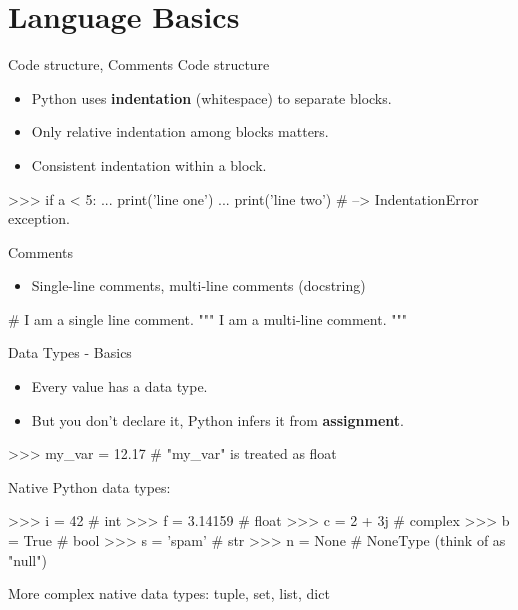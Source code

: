 \documentclass[10pt]{beamer}
\begin{document}
\section{Language Basics}

\begin{frame}[fragile]{Code structure, Comments}
	Code structure
	\begin{itemize}
		\item \pause Python uses \textbf{indentation} (whitespace) to separate blocks.
		\item \pause Only relative indentation among blocks matters.
		\item \pause Consistent indentation within a block.
	\end{itemize}

	\pause
    \begin{pythoncode}
		>>> if a < 5:
		...    print('line one')
		...      print('line two') # --> IndentationError exception.
    \end{pythoncode}

    \pause

    Comments
    \begin{itemize}
	\item \pause Single-line comments, multi-line comments (docstring)
    \end{itemize}

	\pause
	 \begin{pythoncode}
	# I am a single line comment.
	""" I am
	a multi-line comment. """
	\end{pythoncode}
\end{frame}

\begin{frame}[fragile]{Data Types - Basics}
	\begin{itemize}
	\item \pause Every value has a data type.
	\item \pause But you don't declare it, Python infers it from \textbf{assignment}.
	\end{itemize}

	 \begin{pythoncode}
		>>> my_var = 12.17   # "my_var" is treated as float
	\end{pythoncode}

	\pause
	Native Python data types:
	
	 \begin{pythoncode}
		>>> i = 42      # int
		>>> f = 3.14159 # float
		>>> c = 2 + 3j  # complex
		>>> b = True    # bool
		>>> s = 'spam'  # str
		>>> n = None    # NoneType (think of as "null")
	\end{pythoncode}

	\pause
	More complex native data types: tuple, set, list, dict
\end{frame}
\end{document}
